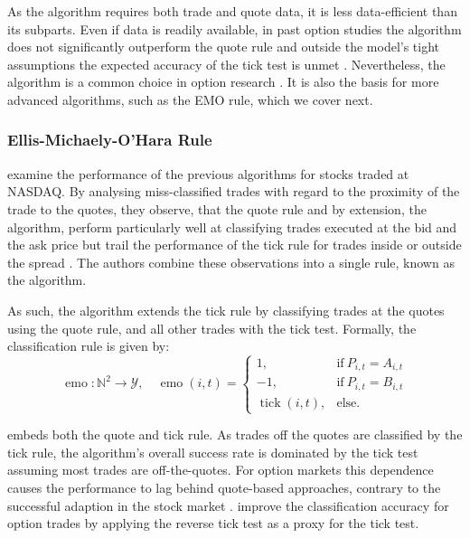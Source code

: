 As the algorithm requires both trade and quote data, it is less data-efficient than its subparts. Even if data is readily available, in past option studies the algorithm does not significantly outperform the quote rule and outside the model's tight assumptions the expected accuracy of the tick test is unmet \autocites[][30--32]{grauerOptionTradeClassification2022}[][886]{savickasInferringDirectionOption2003}. Nevertheless, the algorithm is a common choice in option research \autocite[cp.][453]{easleyOptionVolumeStock1998}. It is also the basis for more advanced algorithms, such as the \gls{EMO} rule, which we cover next.

\subsubsection{Ellis-Michaely-O'Hara
    Rule}\label{sec:ellis-michaely-ohara-rule}

\textcite[][536]{ellisAccuracyTradeClassification2000} examine the performance of the previous algorithms for stocks traded at \gls{NASDAQ}. By analysing miss-classified trades with regard to the proximity of the trade to the quotes, they observe, that the quote rule and by extension, the  algorithm, perform particularly well at classifying trades executed at the bid and the ask price but trail the performance of the tick rule for trades inside or outside the spread \autocite[][535--536]{ellisAccuracyTradeClassification2000}. The authors combine these observations into a single rule, known as the  algorithm.

As such, the  algorithm extends the tick rule by classifying trades at the quotes using the quote rule, and all other trades with the tick test. Formally, the classification rule is given by:
\begin{equation}
    \operatorname{emo} \colon \mathbb{N}^2 \to \mathcal{Y}, \quad
    \operatorname{emo}(i, t)=
    \begin{cases}
        1,                         & \text{if}\ P_{i, t} = A_{i, t} \\
        -1,                        & \text{if}\ P_{i, t} = B_{i, t} \\
        \operatorname{tick}(i, t), & \text{else}.
    \end{cases}
    \label{eq:emo-rule}
\end{equation}

 embeds both the quote and tick rule. As trades off the quotes are classified by the tick rule, the algorithm's overall success rate is dominated by the tick test assuming most trades are off-the-quotes. For option markets \autocites[cp.][891]{savickasInferringDirectionOption2003}[][21]{grauerOptionTradeClassification2022} this dependence causes the performance to lag behind quote-based approaches, contrary to the successful adaption in the stock market \autocites[][541]{ellisAccuracyTradeClassification2000}[][3818]{chakrabartyTradeClassificationAlgorithms2007}. \textcite[][31--35]{grauerOptionTradeClassification2022} improve the classification accuracy for option trades by applying the reverse tick test as a proxy for the tick test.


